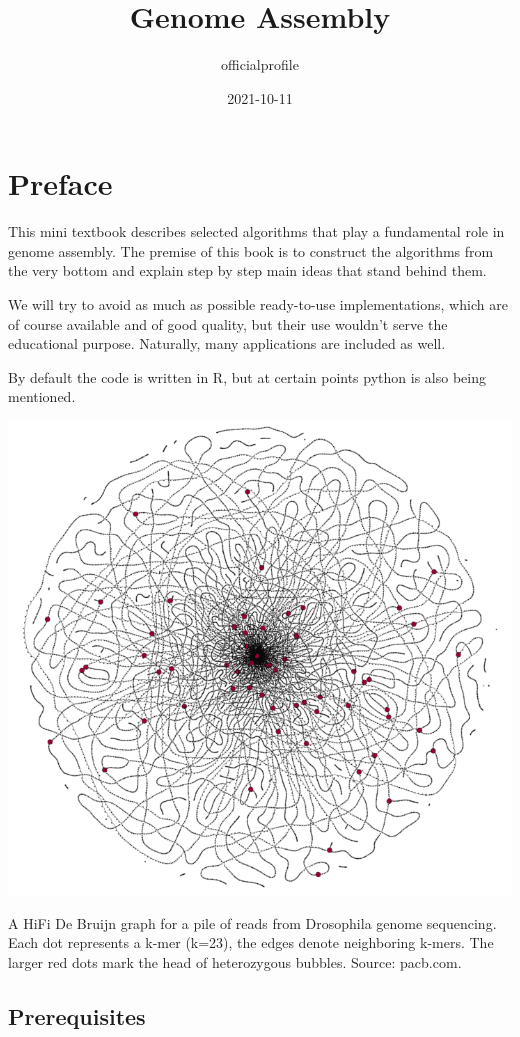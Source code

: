 \documentclass[
]{book}
\title{Genome Assembly}
\author{officialprofile}
\date{2021-10-11}
\begin{document}
\maketitle

{
\setcounter{tocdepth}{1}
\tableofcontents
}
\hypertarget{preface}{%
\chapter{Preface}\label{preface}}

This mini textbook describes selected algorithms that play a fundamental role in genome assembly. The premise of this book is to construct the algorithms from the very bottom and explain step by step main ideas that stand behind them.

We will try to avoid as much as possible ready-to-use implementations, which are of course available and of good quality, but their use wouldn't serve the educational purpose. Naturally, many applications are included as well.

By default the code is written in R, but at certain points python is also being mentioned.

\begin{center}\includegraphics[width=0.8\linewidth]{img/cover} \end{center}

A HiFi De Bruijn graph for a pile of reads from Drosophila genome sequencing. Each dot represents a k-mer (k=23), the edges denote neighboring k-mers. The larger red dots mark the head of heterozygous bubbles. Source: pacb.com.

\hypertarget{prerequisites}{%
\section{Prerequisites}\label{prerequisites}}
\end{document}
